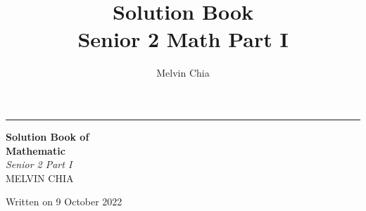 \documentclass{report}
\title{{\Huge \textbf{Solution Book}} \\ {\large Senior 2 Math Part I}}
\author{Melvin Chia}
\begin{document}
\newcommand{\sol}{\\~\\\noindent \textbf{Sol.}}
\newcommand*{\plogo}{\fbox{$\mathcal{PL}$}}
\begin{titlepage}
  \raggedleft
  \rule{1pt}{\textheight}
  \hspace{0.02\textwidth}
  \parbox[b]{0.75\textwidth}{

  {\Huge\bfseries Solution Book of \\[0.5\baselineskip] Mathematic}\\[2\baselineskip]
  {\large\textit{Senior 2 Part I}}\\[4\baselineskip]
  {\Large\textsc{MELVIN CHIA}}

  \vspace{0.5\textheight}

  {\noindent Written on 9 October 2022}\\[\baselineskip]
  }

\end{titlepage}

\doublespacing
\tableofcontents
\singlespacing
\newpage
\end{document}

